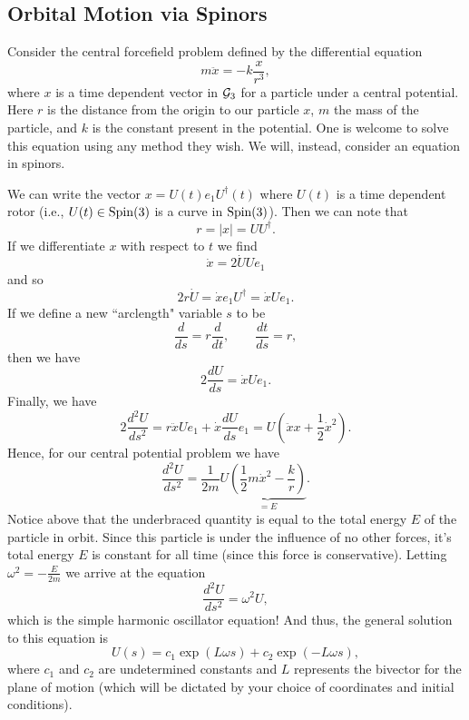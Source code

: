 \subsection{Orbital Motion via Spinors}

Consider the central forcefield problem defined by the differential equation
\[
m\ddot{x} = -k\frac{x}{r^3},
\]
where $x$ is a time dependent vector in $\mathcal{G}_3$ for a particle under a central potential. Here $r$ is the distance from the origin to our particle $x$, $m$ the mass of the particle, and $k$ is the constant present in the potential. One is welcome to solve this equation using any method they wish. We will, instead, consider an equation in spinors.  

We can write the vector $x=U(t)e_1U^\dagger(t)$ where $U(t)$ is a time dependent rotor (i.e., $U(t) \in \mathrm{Spin}(3)$ is a curve in $\mathrm{Spin}(3)$).  Then we can note that 
\[
r=|x|=UU^\dagger.
\]
If we differentiate $x$ with respect to $t$ we find
\[
\dot{x} = 2\dot{U}{U}e_1
\]
and so
\[
2r\dot{U}=\dot{x}e_1 U^\dagger = \dot{x}Ue_1.
\]
If we define a new ``arclength" variable $s$ to be
\[
\frac{d}{ds} = r\frac{d}{dt}, \qquad \frac{dt}{ds}=r,
\]
then we have
\[
2\frac{dU}{ds}=\dot{x}Ue_1.
\]
Finally, we have
\[
2\frac{d^2 U}{ds^2}=r\ddot{x}Ue_1 + \dot{x}\frac{dU}{ds}e_1 = U\left(\ddot{x}x+\frac{1}{2}\dot{x}^2\right).
\]
Hence, for our central potential problem we have
\[
\frac{d^2U}{ds^2}=\frac{1}{2m}U\underbrace{\left( \frac{1}{2}m\dot{x}^2-\frac{k}{r}\right)}_{=E}. 
\]
Notice above that the underbraced quantity is equal to the total energy $E$ of the particle in orbit. Since this particle is under the influence of no other forces, it's total energy $E$ is constant for all time (since this force is conservative). Letting $\omega^2=-\frac{E}{2m}$ we arrive at the equation
\[
\frac{d^2U}{ds^2}=\omega^2 U,
\]
which is the simple harmonic oscillator equation! And thus, the general solution to this equation is
\[
U(s)=c_1 \exp(L\omega s) + c_2 \exp(-L\omega s),
\]
where $c_1$ and $c_2$ are undetermined constants and $L$ represents the bivector for the plane of motion (which will be dictated by your choice of coordinates and initial conditions).


